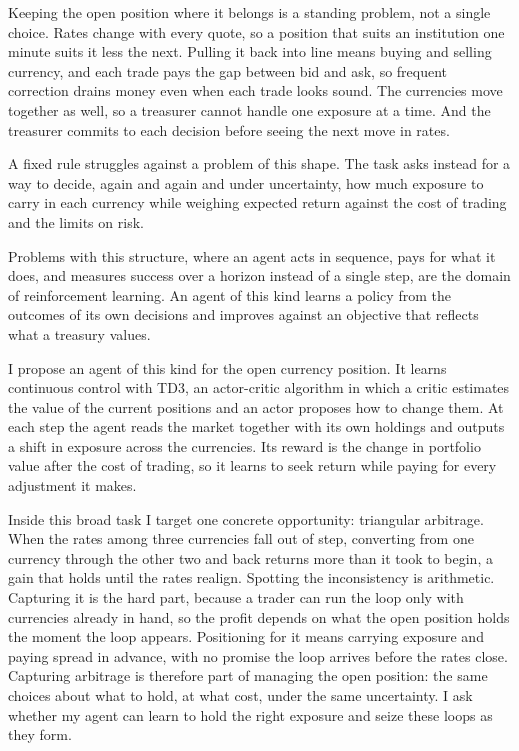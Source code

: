\documentclass[12pt,a4paper]{article}
\begin{document}
Keeping the open position where it belongs is a standing problem, not a single choice. Rates
change with every quote, so a position that suits an institution one minute suits it less the
next. Pulling it back into line means buying and selling currency, and each trade pays the
gap between bid and ask, so frequent correction drains money even when each trade looks
sound. The currencies move together as well, so a treasurer cannot handle one exposure at a
time. And the treasurer commits to each decision before seeing the next move in rates.

A fixed rule struggles against a problem of this shape. The task asks instead for a way to
decide, again and again and under uncertainty,
how much exposure to carry in each currency while weighing expected return against the cost
of trading and the limits on risk.

Problems with this structure, where an agent acts in sequence, pays for what it does, and
measures success over a horizon instead of a single step, are the domain of reinforcement
learning. An agent of this kind learns a policy from the outcomes of its own decisions and
improves against an objective that reflects what a treasury values.

I propose an agent of this kind for the open currency position. It learns continuous control
with TD3, an actor-critic algorithm in which a critic estimates the value of the current
positions and an actor proposes how to change them. At each step the agent reads the market
together with its own holdings and outputs a shift in exposure across the currencies. Its
reward is the change in portfolio value after the cost of trading, so it learns to seek
return while paying for every adjustment it makes.

Inside this broad task I target one concrete opportunity: triangular arbitrage. When the
rates among three currencies fall out of step, converting from one currency through the other
two and back returns more than it took to begin, a gain that holds until the rates realign.
Spotting the inconsistency is arithmetic. Capturing it is the hard part, because a trader can
run the loop only with currencies already in hand, so the profit depends on what the open
position holds the moment the loop appears. Positioning for it means carrying exposure and
paying spread in advance, with no promise the loop arrives before the rates close. Capturing
arbitrage is therefore part of managing the open position: the same choices about what to
hold, at what cost, under the same uncertainty. I ask whether my agent can learn to hold
the right exposure and seize these loops as they form.
\end{document}
